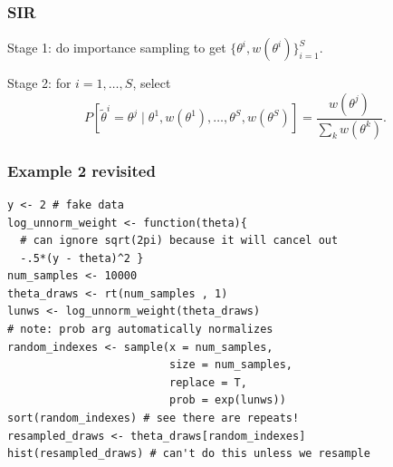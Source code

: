 \documentclass{beamer}
\begin{document}

\begin{frame}[fragile]
\frametitle{SIR}


Stage 1: do importance sampling to get $\{ \theta^i, w(\theta^i) \}_{i=1}^S$.
\newline

Stage 2: for $i = 1, \ldots, S$, select 
$$
P[ \tilde{\theta}^i = \theta^j \mid \theta^1, w(\theta^1), \ldots, \theta^S, w(\theta^S) ] = \frac{w(\theta^j)}{ \sum_k w(\theta^k) }.
$$

\end{frame}







\begin{frame}[fragile]
\frametitle{Example 2 revisited}

\begin{verbatim}
y <- 2 # fake data
log_unnorm_weight <- function(theta){ 
  # can ignore sqrt(2pi) because it will cancel out
  -.5*(y - theta)^2 }
num_samples <- 10000
theta_draws <- rt(num_samples , 1)
lunws <- log_unnorm_weight(theta_draws)
# note: prob arg automatically normalizes
random_indexes <- sample(x = num_samples, 
                         size = num_samples, 
                         replace = T, 
                         prob = exp(lunws)) 
sort(random_indexes) # see there are repeats!
resampled_draws <- theta_draws[random_indexes]
hist(resampled_draws) # can't do this unless we resample
\end{verbatim}

\end{frame}
\end{document}
